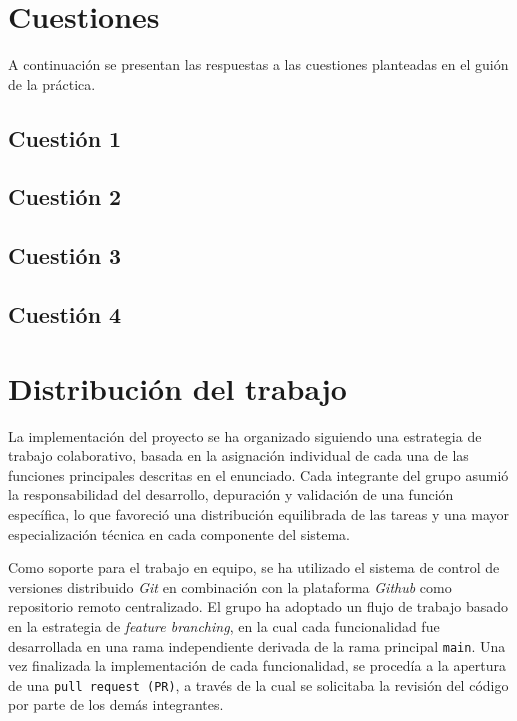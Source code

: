 \documentclass[11pt,a4paper]{article}
\begin{document}
\vspace{3ex}

\section{Cuestiones}
A continuación se presentan las respuestas a las cuestiones planteadas en el guión de la práctica. \vspace{2ex}

\subsection{Cuestión 1}
\vspace{3ex}

\subsection{Cuestión 2}
\vspace{3ex}

\subsection{Cuestión 3}
\vspace{3ex}

\subsection{Cuestión 4}
\vspace{3ex}

\vspace{3ex}
\section{Distribución del trabajo}
La implementación del proyecto se ha organizado siguiendo una estrategia de trabajo colaborativo, basada en la asignación individual de cada una de las funciones principales descritas en el enunciado. Cada integrante del grupo asumió la responsabilidad del desarrollo, depuración y validación de una función específica, lo que favoreció una distribución equilibrada de las tareas y una mayor especialización técnica en cada componente del sistema. \vspace{2ex}

\noindent Como soporte para el trabajo en equipo, se ha utilizado el sistema de control de versiones distribuido \textit{Git} en combinación con la plataforma \textit{Github} como repositorio remoto centralizado. El grupo ha adoptado un flujo de trabajo basado en la estrategia de \textit{feature branching}, en la cual cada funcionalidad fue desarrollada en una rama independiente derivada de la rama principal \texttt{main}. Una vez finalizada la implementación de cada funcionalidad, se procedía a la apertura de una \texttt{pull request (PR)}, a través de la cual se solicitaba la revisión del código por parte de los demás integrantes. \vspace{2ex}
\end{document}
